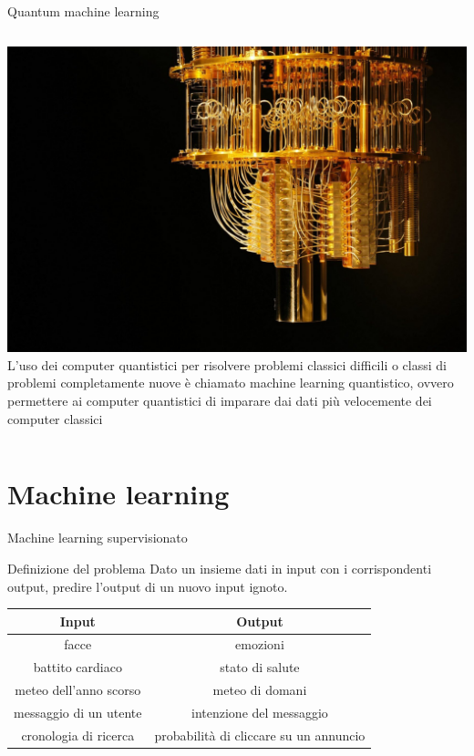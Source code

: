 \documentclass{beamer}
\begin{document}
    \begin{frame}{Quantum machine learning}
        \begin{columns}
            \includegraphics[width=\textwidth]{gfx/quantum-computer.jpg}
            L'uso dei computer quantistici per risolvere problemi classici difficili o classi di problemi completamente nuove è chiamato machine learning quantistico, 
            ovvero permettere ai computer quantistici di imparare dai dati più velocemente dei computer classici
        \end{columns}
    \end{frame}

    \section{Machine learning}

    \begin{frame}{Machine learning supervisionato}
        \begin{block}{Definizione del problema}
            Dato un insieme dati in input con i corrispondenti output, predire l'output di un nuovo input ignoto. 
        \end{block}
        \begin{tabular}{cc}
            Input & Output \\ \hline
            facce & emozioni \\ 
            battito cardiaco & stato di salute \\ 
            meteo dell'anno scorso & meteo di domani \\ 
            messaggio di un utente & intenzione del messaggio \\ 
            cronologia di ricerca & probabilità di cliccare su un annuncio
        \end{tabular}
    \end{frame}
\end{document}
